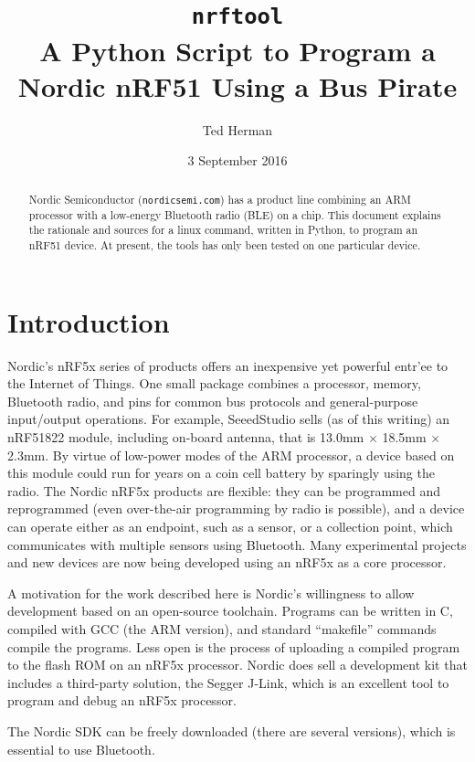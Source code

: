 \documentclass{article}
\begin{document}
\title{\texttt{nrftool} \\ A Python Script to Program a Nordic nRF51 Using a Bus Pirate}
\author{Ted Herman}
\date{3 September 2016}
\maketitle
\begin{abstract}
Nordic Semiconductor (\texttt{nordicsemi.com}) has a product line combining an ARM processor
with a low-energy Bluetooth radio (BLE) on a chip. This document explains the rationale and
sources for a linux command, written in Python, to program an nRF51 device. At present, the 
tools has only been tested on one particular device. 
\end{abstract}
\section*{Introduction}
Nordic's nRF5x series of products offers an inexpensive yet powerful entr'ee to the Internet 
of Things. One small package combines a processor, memory, Bluetooth radio, and pins for 
common bus protocols and general-purpose input/output operations. For example, SeeedStudio 
sells (as of this writing) an nRF51822 module, including on-board antenna, that is  
13.0mm $\times$ 18.5mm $\times$ 2.3mm. By virtue of low-power modes of the ARM processor, 
a device based on this module could run for years on a coin cell battery by sparingly using the radio.
The Nordic nRF5x products are flexible: they can be programmed and reprogrammed (even over-the-air
programming by radio is possible), and a device can operate either as an endpoint, such as a sensor,
or a collection point, which communicates with multiple sensors using Bluetooth. Many experimental
projects and new devices are now being developed using an nRF5x as a core processor.
\par
A motivation for the work described here is Nordic's willingness to allow development based on an 
open-source toolchain. Programs can be written in C, compiled with GCC (the ARM version), and 
standard ``makefile'' commands compile the programs. Less open is the process of uploading a 
compiled program to the flash ROM on an nRF5x processor. Nordic does sell a development kit that
includes a third-party solution, the Segger J-Link, which is an excellent tool to program and debug
an nRF5x processor. 
\par
The Nordic SDK can be freely downloaded (there are several versions), which is essential to use Bluetooth.
\end{document}
